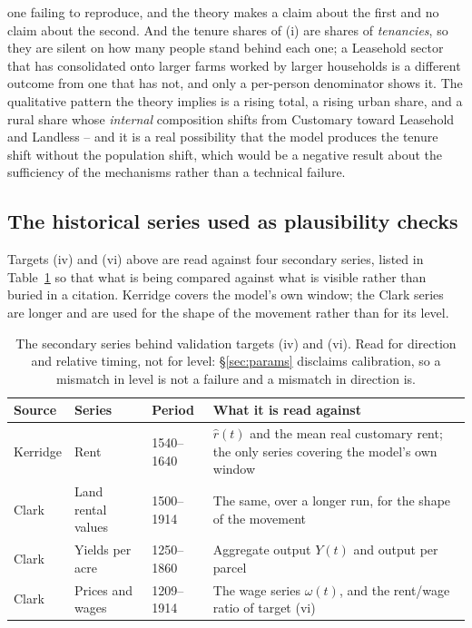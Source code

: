 \documentclass[11pt,english]{article}
\begin{document}
one failing to reproduce, and the theory makes a claim about the first and no claim about the second. And the tenure shares of (i) are shares of \emph{tenancies}, so they are silent on how many people stand behind each one; a Leasehold sector that has consolidated onto larger farms worked by larger households is a different outcome from one that has not, and only a per-person denominator shows it. The qualitative pattern the theory implies is a rising total, a rising urban share, and a rural share whose \emph{internal} composition shifts from Customary toward Leasehold and Landless -- and it is a real possibility that the model produces the tenure shift without the population shift, which would be a negative result about the sufficiency of the mechanisms rather than a technical failure.

\subsection{The historical series used as plausibility checks}
\label{sec:series}

Targets (iv) and (vi) above are read against four secondary series, listed in Table~\ref{tab:series} so that what is being compared against what is visible rather than buried in a citation. Kerridge covers the model's own window; the Clark series are longer and are used for the shape of the movement rather than for its level.

\begin{table}[H]
\centering
\small
\begin{tabular}{@{}p{}p{}p{}p{}@{}}
\toprule
\textbf{Source} & \textbf{Series} & \textbf{Period} & \textbf{What it is read against} \\
\midrule
Kerridge \cite{kerridge1953movement} & Rent & 1540--1640 & $\hat r(t)$ and the mean real customary rent; the only series covering the model's own window \\
Clark \cite{clark2002land} & Land rental values & 1500--1914 & The same, over a longer run, for the shape of the movement \\
Clark \cite{clark1991yields} & Yields per acre & 1250--1860 & Aggregate output $Y(t)$ and output per parcel \\
Clark \cite{clark2004price} & Prices and wages & 1209--1914 & The wage series $\omega(t)$, and the rent/wage ratio of target (vi) \\
\bottomrule
\end{tabular}
\caption{The secondary series behind validation targets (iv) and (vi). Read for direction and relative timing, not for level: \S\ref{sec:params} disclaims calibration, so a mismatch in level is not a failure and a mismatch in direction is.}
\label{tab:series}
\end{table}
\end{document}

